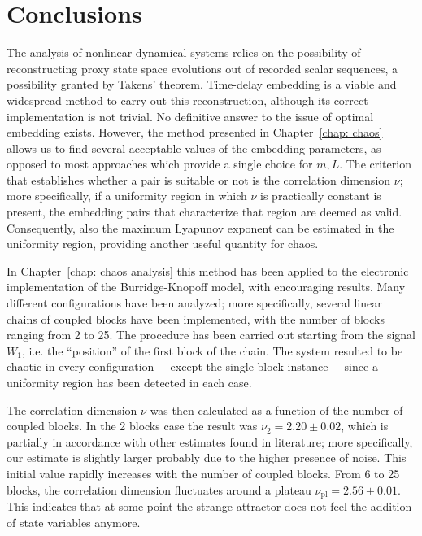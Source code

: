 \chapter*{Conclusions}

The analysis of nonlinear dynamical systems relies on the possibility of reconstructing proxy state space
evolutions out of recorded scalar sequences, a possibility granted by Takens' theorem. Time-delay
embedding is a viable and widespread method to carry out this reconstruction, although its correct
implementation is not trivial. No definitive answer to the issue of optimal embedding exists.
However, the method presented in Chapter~\ref{chap: chaos} allows us to find several acceptable
values of the embedding parameters, as opposed to most approaches which provide a single choice for
$m,L$. The criterion that establishes whether a pair is suitable or not is the correlation dimension
$\nu$; more specifically, if a uniformity region in which $\nu$ is practically constant is present,
the embedding pairs that characterize that region are deemed as valid. Consequently, also the maximum
Lyapunov exponent can be estimated in the uniformity region, providing another useful quantity for chaos.

In Chapter~\ref{chap: chaos analysis} this method has been applied to the electronic implementation of
the Burridge-Knopoff model, with encouraging results. Many different configurations have been analyzed;
more specifically, several linear chains of coupled blocks have been implemented, with the number of
blocks ranging from 2 to 25. The procedure has been carried out starting from the signal $W_1$, i.e.
the ``position'' of the first block of the chain. The system resulted to be chaotic in every
configuration $-$ except the single block instance $-$ since a uniformity region has been detected in
each case.

The correlation dimension $\nu$ was then calculated as a function of the number of coupled
blocks. In the 2 blocks case the result was $\nu_2=2.20\pm0.02$, which is partially in accordance with
other estimates found in literature; more specifically, our estimate is slightly larger probably due
to the higher presence of noise. This initial value rapidly increases with the
number of coupled blocks. From 6 to 25 blocks, the correlation dimension fluctuates around a plateau
$\nu_{\text{pl}}=2.56\pm0.01$. This indicates that at some point the strange attractor does not feel
the addition of state variables anymore.

